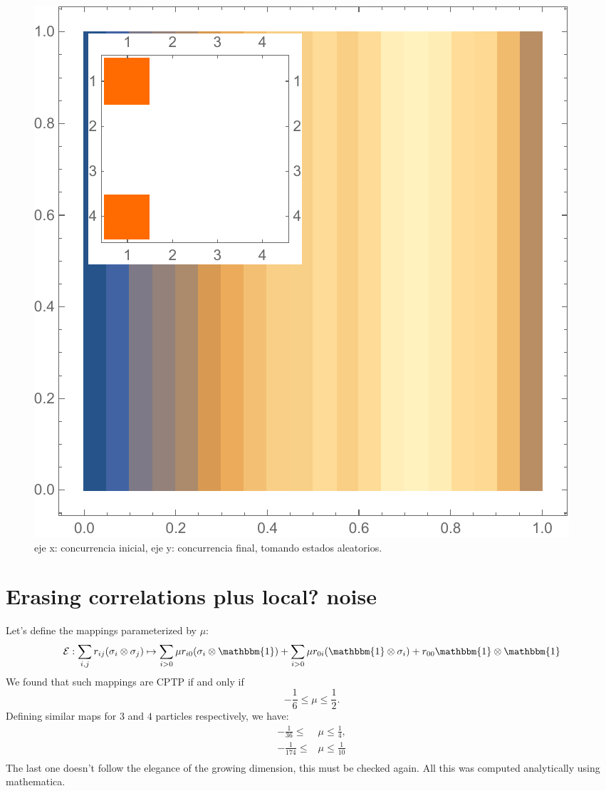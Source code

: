 \documentclass[letterpaper,12pt]{article} %
\newcommand{\one}{\mathbbm{1}}
\newcommand{\<}{\langle}
\newcommand{\mcE}{\mathcal{E}}
\begin{document}
\begin{figure}[H]
\includegraphics[scale=0.5]{distro_triv.pdf}
\caption{eje x: concurrencia inicial, eje y: concurrencia final, tomando estados aleatorios.}
\end{figure}
\section{Erasing correlations plus local? noise}
Let's define the mappings parameterized by $\mu$:
\begin{equation}
\mcE:\sum_{i,j} r_{ij} (\sigma_i \otimes \sigma_j) \mapsto \sum_{i>0} \mu r_{i0} (\sigma_i\otimes \one) +\sum_{i>0} \mu r_{0i} (\one \otimes \sigma_i)+r_{00} \one\otimes \one
\end{equation}
We found that such mappings are CPTP if and only if
\begin{equation}
-\frac{1}{6}\leq \mu\leq \frac{1}{2}.
\end{equation}
Defining similar maps for $3$ and $4$ particles respectively, we have:
\begin{align}
-\frac{1}{36}\leq &\mu\leq \frac{1}{4},\\
-\frac{1}{174}\leq &\mu \leq \frac{1}{10}\\
\end{align}
The last one doesn't follow the elegance of the growing dimension, this must be checked again. All this was computed analytically using mathematica.
\end{document}
